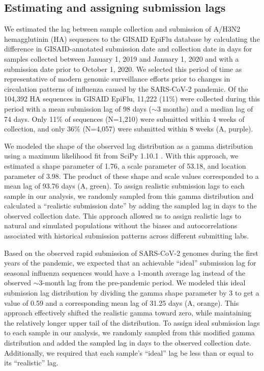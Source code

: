 \documentclass[9pt,lineno]{elife}
\begin{document}
\subsection{Estimating and assigning submission lags}

We estimated the lag between sample collection and submission of A/H3N2 hemagglutinin (HA) sequences to the GISAID EpiFlu database \citep{gisaid} by calculating the difference in GISAID-annotated submission date and collection date in days for samples collected between January 1, 2019 and January 1, 2020 and with a submission date prior to October 1, 2020.
We selected this period of time as representative of modern genomic surveillance efforts prior to changes in circulation patterns of influenza caused by the SARS-CoV-2 pandemic.
Of the 104,392 HA sequences in GISAID EpiFlu, 11,222 (11\%) were collected during this period with a mean submission lag of 98 days ($\sim$3 months) and a median lag of 74 days.
Only 11\% of sequences (N=1,210) were submitted within 4 weeks of collection, and only 36\% (N=4,057) were submitted within 8 weeks (A, purple).

We modeled the shape of the observed lag distribution as a gamma distribution using a maximum likelihood fit from SciPy 1.10.1 \citep{scipy}.
With this approach, we estimated a shape parameter of 1.76, a scale parameter of 53.18, and location parameter of 3.98.
The product of these shape and scale values corresponded to a mean lag of 93.76 days (A, green).
To assign realistic submission lags to each sample in our analysis, we randomly sampled from this gamma distribution and calculated a ``realistic submission date'' by adding the sampled lag in days to the observed collection date.
This approach allowed us to assign realistic lags to natural and simulated populations without the biases and autocorrelations associated with historical submission patterns across different submitting labs.

Based on the observed rapid submission of SARS-CoV-2 genomes during the first years of the pandemic, we expected that an achievable ``ideal'' submission lag for seasonal influenza sequences would have a 1-month average lag instead of the observed $\sim$3-month lag from the pre-pandemic period.
We modeled this ideal submission lag distribution by dividing the gamma shape parameter by 3 to get a value of 0.59 and a corresponding mean lag of 31.25 days (A, orange).
This approach effectively shifted the realistic gamma toward zero, while maintaining the relatively longer upper tail of the distribution.
To assign ideal submission lags to each sample in our analysis, we randomly sampled from this modified gamma distribution and added the sampled lag in days to the observed collection date.
Additionally, we required that each sample's ``ideal'' lag be less than or equal to its ``realistic'' lag.
\end{document}
